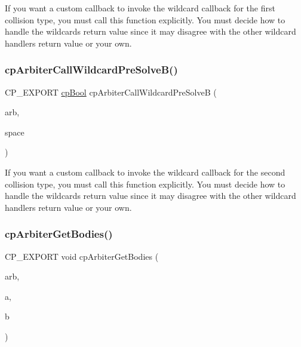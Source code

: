 If you want a custom callback to invoke the wildcard callback for the first collision type, you must call this function explicitly. You must decide how to handle the wildcard\textquotesingle{}s return value since it may disagree with the other wildcard handler\textquotesingle{}s return value or your own. \mbox{\label{group__cp_arbiter_ga61954fc86039826a56e504f483ebe8a6}} 
\subsubsection{\texorpdfstring{cp\+Arbiter\+Call\+Wildcard\+Pre\+Solve\+B()}{cpArbiterCallWildcardPreSolveB()}}
{\footnotesize\ttfamily C\+P\+\_\+\+E\+X\+P\+O\+RT \mbox{\hyperlink{group__basic_types_gabc5e752c48f3449ca26ef413ecbd647e}{cp\+Bool}} cp\+Arbiter\+Call\+Wildcard\+Pre\+SolveB (\begin{DoxyParamCaption}\item[{\mbox{\hyperlink{structcp_arbiter}{cp\+Arbiter}} $\ast$}]{arb,  }\item[{\mbox{\hyperlink{structcp_space}{cp\+Space}} $\ast$}]{space }\end{DoxyParamCaption})}

If you want a custom callback to invoke the wildcard callback for the second collision type, you must call this function explicitly. You must decide how to handle the wildcard\textquotesingle{}s return value since it may disagree with the other wildcard handler\textquotesingle{}s return value or your own. \mbox{\label{group__cp_arbiter_gac5371d101c55a8a9c5b471e12010a8b3}} 
\subsubsection{\texorpdfstring{cp\+Arbiter\+Get\+Bodies()}{cpArbiterGetBodies()}}
{\footnotesize\ttfamily C\+P\+\_\+\+E\+X\+P\+O\+RT void cp\+Arbiter\+Get\+Bodies (\begin{DoxyParamCaption}\item[{const \mbox{\hyperlink{structcp_arbiter}{cp\+Arbiter}} $\ast$}]{arb,  }\item[{\mbox{\hyperlink{structcp_body}{cp\+Body}} $\ast$$\ast$}]{a,  }\item[{\mbox{\hyperlink{structcp_body}{cp\+Body}} $\ast$$\ast$}]{b }\end{DoxyParamCaption})}

